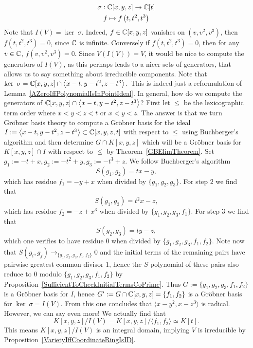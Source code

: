 \begin{example}
\begin{enumerate}
    \begin{gather*}
        \sigma : \mathbb{C}[x,y,z]\rightarrow \mathbb{C}[t]\\
        f\mapsto f\left(t,t^2,t^3\right)
    \end{gather*}
    Note that $I(V)=\ker \ \sigma$. Indeed, $f\in \mathbb{C}[x,y,z]$ vanishes on $\left(v,v^2,v^3\right)$, then $f\left(t,t^2,t^3\right)=0$, since $\mathbb{C}$ is infinite. Conversely if $f\left(t,t^2,t^3\right)=0$, then for any $v\in \mathbb{C}$, $f\left(v,v^2,v^3\right)=0$. Since $V(I(V))=V$, it would be nice to compute the generators of $I(V)$, as this perhaps leads to a nicer sets of generators, that allows us to say something about irreducible components. Note that $\ker \ \sigma = \mathbb{C}[x,y,z]\cap \left\langle x-t,y-t^2,z-t^3\right\rangle.$ This is indeed just a reformulation of Lemma~\ref{AZeroIffPolynomialIsInPointIdeal}. In general, how do we compute the generators of $\mathbb{C}[x,y,z]\cap \left\langle x-t,y-t^2,z-t^3\right\rangle$? First let $\leq$ be the lexicographic term order where $x<y<z<t$ or $x<y<z$. The answer is that we turn Gröbner basis theory to compute a Gröbner basis for the ideal $I:=\left\langle x-t,y-t^2,z-t^3\right\rangle\subset \mathbb{C}[x,y,z,t]$ with respect to $\leq$ using Buchberger's algorithm and then determine $G\cap K[x,y,z]$ which will be a Gröbner basis for $K[x,y,z]\cap I$ with respect to $\leq$ by Theorem~\ref{GBElimTheorem}. Set $g_1:=-t+x, g_2:= -t^2+y, g_3:= -t^3+z$. We follow Buchberger's algorithm
    $$S(g_1,g_2) = tx-y,$$
    which has residue $f_1=-y+x$ when divided by $\{g_1,g_2,g_3\}$. For step 2 we find that 
    $$S(g_1,g_3)= t^2x-z,$$
    which has residue $f_2 = -z+x^3$ when divided by $\{g_1,g_2,g_3,f_1\}$. For step 3 we find that 
    $$S(g_2,g_3)=ty-z,$$
    which one verifies to have residue $0$ when divided by $\{g_1,g_2,g_3,f_1,f_2\}$. Note now that $S(g_i,g_j)\to_{\{g_1,g_2,g_3,f_1,f_2\}} 0$ and the initial terms of the remaining pairs have pairwise greatest common divisor $1$, hence the $S$-polynomial of these pairs also reduce to $0$ modulo $\{g_1,g_2,g_3,f_1,f_2\}$ by Proposition~\ref{SufficientToCheckInitialTermsCoPrime}. Thus $G := \{g_1,g_2,g_3,f_1,f_2\}$ is a Gröbner basis for $I$, hence $G' := G \cap \mathbb{C}[x,y,z] = \{f_1,f_2\}$ is a Gröbner basis for $\ker \ \sigma = I(V)$. From this one concludes that $\langle x-y^2,x-z^3\rangle$ is radical. However, we can say even more! We actually find that 
    $$K[x,y,z]/I(V) =  K[x,y,z]/\langle f_1,f_2\rangle \simeq K[t].$$
    This means $K[x,y,z]/I(V)$ is an integral domain, implying $V$ is irreducible by Proposition~\ref{VarietyIffCoordinateRingIsID}.
    \end{enumerate}
\end{example}

